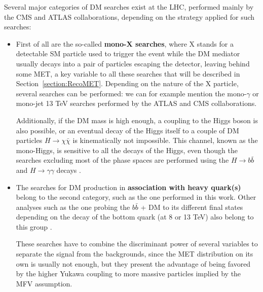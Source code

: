 \documentclass[a4paper, 10pt, openright]{report}
\begin{document}
Several major categories of \ac{DM} searches exist at the \ac{LHC}, performed mainly by the \ac{CMS} and \ac{ATLAS} collaborations, depending on the strategy applied for such searches:

\begin{itemize}
\item First of all are the so-called \textbf{mono-X searches}, where X stands for a detectable \ac{SM} particle used to trigger the event while the \ac{DM} mediator usually decays into a pair of particles escaping the detector, leaving behind some \ac{MET}, a key variable to all these searches that will be described in Section~\ref{section:RecoMET}. Depending on the nature of the X particle, several searches can be performed: we can for example mention the mono-$\gamma$ \cite{MonoGammaAtlas, MonoGammaCMS} or mono-jet \cite{MonoJetCMS, MonoJetCMS2} 13 TeV searches performed by the \ac{ATLAS} and \ac{CMS} collaborations.


Additionally, if the \ac{DM} mass is high enough, a coupling to the Higgs boson is also possible, or an eventual decay of the Higgs itself to a couple of \ac{DM} particles $H \rightarrow \chi \bar \chi$ is kinematically not impossible. This channel, known as the mono-Higgs, is sensitive to all the decays of the Higgs, even though the searches excluding most of the phase spaces are performed using the $H \rightarrow b \bar b$ and $H \rightarrow \gamma \gamma$ decays \cite{MonoHiggsAtlas, MonoHiggsCMS}. 

\item The searches for \ac{DM} production in \textbf{association with heavy quark(s)} belong to the second category, such as the one performed in this work. Other analyses such as the one probing the $b \bar b$ + DM to its different final states  depending on the decay of the bottom quark (at 8 or 13 TeV) also belong to this group \cite{PreviousDoubleTopBottomAllLep13ATLAS}. 

These searches have to combine the discriminant power of several variables to separate the signal from the backgrounds, since the \ac{MET} distribution on its own is usually not enough, but they present the advantage of being favored by the higher Yukawa coupling to more massive particles implied by the \ac{MFV} assumption.


\end{itemize}
\end{document}
